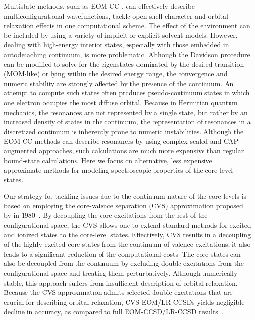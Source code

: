 \documentclass[journal=jctcce,manuscript=article]{achemso}
\begin{document}
Multistate methods, such as EOM-CC \cite{Emrich:81:EOM1,koch1990,Stanton:93:EOMCC,Christiansen2006,krylov_eom_2008,Christiansen:EOMRev:11,CC_EOMCC_Bartlett}, can effectively describe multiconfigurational wavefunctions, tackle open-shell character and  orbital relaxation effects in one computational scheme. The effect of the environment can be included by using a variety of implicit or explicit solvent models. 
However, dealing with high-energy interior states,
especially with those embedded in autodetaching continuum, is more problematic.  
Although the Davidson procedure can be modified
to solve for the eigenstates dominated by the desired transition (MOM-like\cite{Gill:MOM:08}) or
lying within the desired energy range\cite{Zuev:Solvers:14,Peng2015},
the convergence and numeric stability are strongly affected by the presence of the continuum.
An attempt to compute such states often produces pseudo-continuum states in which one electron occupies the most diffuse orbital\cite{Zuev:PYP:10}. Because in Hermitian quantum mechanics, the resonances are not represented by a single state, but rather by an increased density of states in the continuum\cite{Moiseyev:Book:11}, 
the representation of resonances in a discretized continuum is inherently prone to numeric instabilities.
Although the EOM-CC methods can describe resonances by using complex-scaled and
CAP-augmented approaches\cite{KrylovResReview},
such calculations are much more expensive than regular bound-state
calculations. Here we focus on alternative, less expensive approximate
methods for modeling spectroscopic properties of the core-level states.

Our strategy for tackling issues due to the continuum nature of the core levels is based on employing the core-valence separation (CVS) approximation proposed by \citeauthor{Cederbaum1980}
in 1980~\cite{Cederbaum1980}. By decoupling the core excitations  from the rest of the configurational space, 
the CVS allows one to extend standard methods for excited and ionized states to the core-level states\cite{wenzel2014,wenzel2015,coriani2015jcp}.
Effectively, CVS results in a decoupling of the highly excited core states from the continuum of valence excitations; it also leads to a significant reduction of the computational costs.
The core states can also be decoupled from the continuum by excluding double excitations from the configurational space and treating them perturbatively\cite{Sadybekov:CoreIE:17}. 
Although numerically stable, this approach suffers from insufficient description of orbital relaxation\cite{Sadybekov:CoreIE:17}.
Because the CVS approximation admits selected 
double excitations that are crucial for describing orbital relaxation, 
CVS-EOM/LR-CCSDs\cite{coriani2015jcp} yields negligible decline in accuracy, as compared to full EOM-CCSD/LR-CCSD results~\cite{coriani2012pra,coriani2012jctc,fransson2013jcp}.
\end{document}
